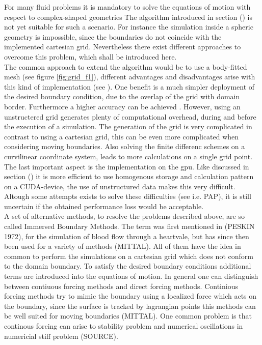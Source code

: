 For many fluid problems it is mandatory to solve the equations of motion with respect to complex-shaped geometries \.
The algorithm introduced in section () is not yet suitable for such a scenario.
For instance the simulation inside a spheric geometry is impossible, since the boundaries
do not coincide with the implemented cartesian grid. Nevertheless there exist different approaches to overcome this problem,
which shall be introduced here. \\
The common approach to extend the algorithm would be to use a body-fitted mesh (see figure \ref{fig:grid_f1}),
different advantages and disadvantages arise with this kind of implementation (see \citep{Mittal2005}).
One benefit is a much simpler deployment of the desired boundary condition, due to the overlap of the grid with domain border.
Furthermore a higher accuracy can be achieved \citep{Gornak2013}.
However, using an unstructered grid generates plenty of computational overhead, during and before the execution of a simulation.
The generation of the grid is very complicated in contrast to using a cartesian grid, this can be even more complicated when
considering moving boundaries.
Also solving the finite differenc schemes on a curvilinear coordinate system, leads to more calculations on a single grid point.
The last important aspect is the implementation on the gpu.
Like discussed in section () it is more efficient to use homogenous storage and calculation pattern on a CUDA-device,
the use of unstructured data makes this very difficult.
Altough some attempts exists to solve these difficulties (see i.e. PAP), it is still uncertain if the obtained performance loss would be acceptable.\\
A set of alternative methods, to resolve the problems described above, are so called Immersed Boundary Methods.
The term was first mentioned in (PESKIN 1972), for the simulation of blood flow through a heartvale, but has since then been used for a variety of
methods (MITTAL).  All of them have the idea in common to perform the simulations on a cartesian grid which does not conform to the domain boundary.
To satisfy the desired boundary conditions additional terms are introduced into the equations of motion.
In general one can distinguish between contiuous forcing methods and direct forcing methods.
Continious forcing methods try to mimic the boundary using a localized force which acts on the boundary,
since the surface is tracked by lagrangian points this methods can be well suited for moving boundaries (MITTAL).
One common problem is that continous forcing can arise to stability problem and numerical oscillations in numericial stiff problem (SOURCE).
